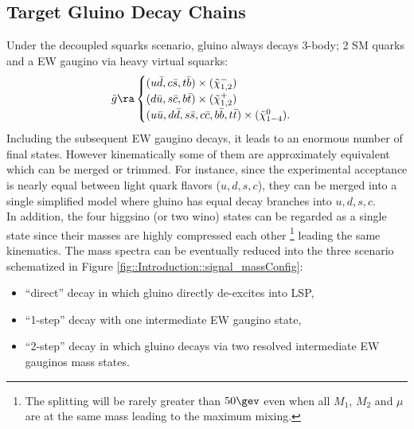 
\subsection{Target Gluino Decay Chains} \label{sec::Introduction::targetModels}
Under the decoupled squarks scenario, gluino always decays 3-body; 2 SM quarks and a EW gaugino via heavy virtual squarks:
\begin{align}
\tg \ra 
  \begin{cases}
    (u\bar{d}, c\bar{s}, t\bar{b}) \times (\tilde{\chi}_{1,2}^{-}) \nn \\
    (d\bar{u}, s\bar{c}, b\bar{t}) \times (\tilde{\chi}_{1,2}^{+})  \nn \\
    (u\bar{u},d\bar{d},s\bar{s},c\bar{c},b\bar{b},t\bar{t}) \times (\tilde{\chi}_{1-4}^{0}). \nn 
  \end{cases}
\label{eq::gluinoDecays}
\end{align}
Including the subsequent EW gaugino decays, it leads to an enormous number of final states.
However kinematically some of them are approximately equivalent which can be merged or trimmed. 
For instance, since the experimental acceptance is nearly equal between light quark flavors ($u,d,s,c$), 
they can be merged into a single simplified model where gluino has equal decay branches into $u,d,s,c$. \\

In addition, the four higgsino (or two wino) states can be regarded as a single state since their masses are highly compressed each other 
\footnote{The splitting will be rarely greater than $50\gev$ even when all $M_1$, $M_2$ and $\mu$ are at the same mass leading to the maximum mixing.} 
leading the same kinematics. 
The mass spectra can be eventually reduced into the three scenario schematized in Figure \ref{fig::Introduction::signal_massConfig}: 
\begin{itemize}
\item ``direct'' decay in which gluino directly de-excites into LSP,
\item ``1-step'' decay with one intermediate EW gaugino state,
\item ``2-step'' decay in which gluino decays via two resolved intermediate EW gauginos mass states.
\end{itemize}


